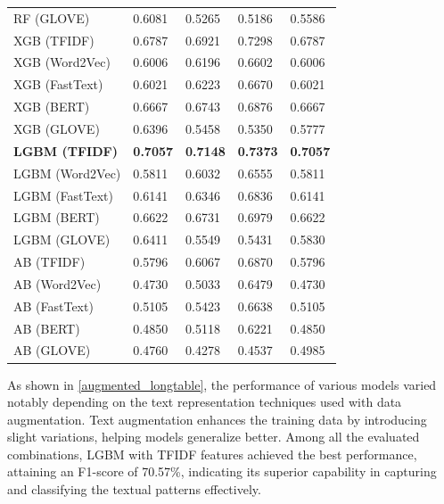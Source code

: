 \begin{longtable}{|p{.40\linewidth}|p{.11\linewidth}|p{.11\linewidth}|p{.11\linewidth}|p{.11\linewidth}|}
RF (GLOVE) & 0.6081 & 0.5265 & 0.5186 & 0.5586 \\
XGB (TFIDF) & 0.6787 & 0.6921 & 0.7298 & 0.6787 \\
XGB (Word2Vec) & 0.6006 & 0.6196 & 0.6602 & 0.6006 \\
XGB (FastText) & 0.6021 & 0.6223 & 0.6670 & 0.6021 \\
XGB (BERT) & 0.6667 & 0.6743 & 0.6876 & 0.6667 \\
XGB (GLOVE) & 0.6396 & 0.5458 & 0.5350 & 0.5777 \\
\textbf{LGBM (TFIDF)} & \textbf{0.7057} & \textbf{0.7148} & \textbf{0.7373} & \textbf{0.7057} \\
LGBM (Word2Vec) & 0.5811 & 0.6032 & 0.6555 & 0.5811 \\
LGBM (FastText) & 0.6141 & 0.6346 & 0.6836 & 0.6141 \\
LGBM (BERT) & 0.6622 & 0.6731 & 0.6979 & 0.6622 \\
LGBM (GLOVE) & 0.6411 & 0.5549 & 0.5431 & 0.5830 \\
AB (TFIDF) & 0.5796 & 0.6067 & 0.6870 & 0.5796 \\
AB (Word2Vec) & 0.4730 & 0.5033 & 0.6479 & 0.4730 \\
AB (FastText) & 0.5105 & 0.5423 & 0.6638 & 0.5105 \\
AB (BERT) & 0.4850 & 0.5118 & 0.6221 & 0.4850 \\
AB (GLOVE) & 0.4760 & 0.4278 & 0.4537 & 0.4985 \\
\end{longtable}

\vspace{-\baselineskip}
\vspace{0.8em}
\noindent
As shown in \autoref{augmented_longtable}, the performance of various models varied notably depending on the text representation techniques used with data augmentation. Text augmentation enhances the training data by introducing slight variations, helping models generalize better. Among all the evaluated combinations, LGBM with TFIDF features achieved the best performance, attaining an F1-score of 70.57\%, indicating its superior capability in capturing and classifying the textual patterns effectively.


